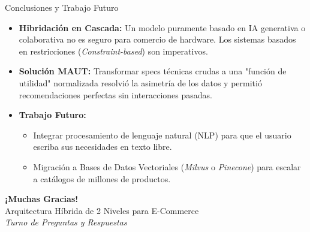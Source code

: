 \documentclass[aspectratio=169]{beamer}
\begin{document}
\begin{frame}{Conclusiones y Trabajo Futuro}
    \begin{itemize}
        \item \textbf{Hibridación en Cascada:} Un modelo puramente basado en IA generativa o colaborativa no es seguro para comercio de hardware. Los sistemas basados en restricciones (\textit{Constraint-based}) son imperativos.
        \item \textbf{Solución MAUT:} Transformar specs técnicas crudas a una "función de utilidad" normalizada resolvió la asimetría de los datos y permitió recomendaciones perfectas sin interacciones pasadas.
        \item \textbf{Trabajo Futuro:} 
        \begin{itemize}
            \item Integrar procesamiento de lenguaje natural (NLP) para que el usuario escriba sus necesidades en texto libre.
            \item Migración a Bases de Datos Vectoriales (\textit{Milvus} o \textit{Pinecone}) para escalar a catálogos de millones de productos.
        \end{itemize}
    \end{itemize}
\end{frame}

\begin{frame}[plain]
    \begin{center}
        \vspace{1cm}
        \Huge \textbf{¡Muchas Gracias!} \\
        \vspace{0.5cm}
        \Large Arquitectura Híbrida de 2 Niveles para E-Commerce \\
        \vspace{1cm}
        \normalsize \textit{Turno de Preguntas y Respuestas}
    \end{center}
\end{frame}
\end{document}
